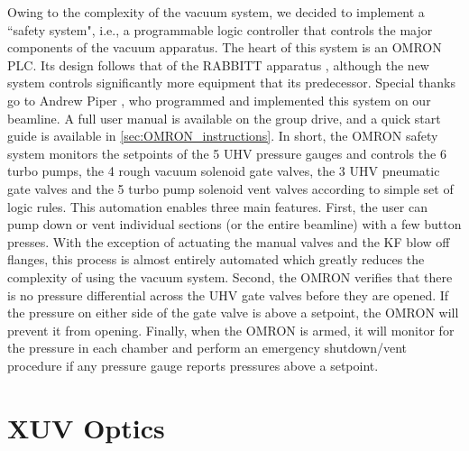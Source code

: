 Owing to the complexity of the vacuum system, we decided to implement a ``safety system", i.e., a programmable logic controller that controls the major components of the vacuum apparatus. The heart of this system is an OMRON PLC. Its design follows that of the RABBITT apparatus \cite{chirlaAttosecondPulseGeneration2011}, although the new system controls significantly more equipment that its predecessor. Special thanks go to Andrew Piper \cite{piperAndrewPiperDissertation}, who programmed and implemented this system on our beamline. A full user manual is available on the group drive, and a quick start guide is available in \cref{sec:OMRON_instructions}. In short, the OMRON safety system monitors the setpoints of the 5 UHV pressure gauges and controls the 6 turbo pumps, the 4 rough vacuum solenoid gate valves, the 3 UHV pneumatic gate valves and the 5 turbo pump solenoid vent valves according to simple set of logic rules. This automation enables three main features. First, the user can pump down or vent individual sections (or the entire beamline) with a few button presses. With the exception of actuating the manual valves and the KF blow off flanges, this process is almost entirely automated which greatly reduces the complexity of using the vacuum system. Second, the OMRON verifies that there is no pressure differential across the UHV gate valves before they are opened. If the pressure on either side of the gate valve is above a setpoint, the OMRON will prevent it from opening. Finally, when the OMRON is armed, it will monitor for the pressure in each chamber and perform an emergency shutdown/vent procedure if any pressure gauge reports pressures above a setpoint.

\section{XUV Optics}
\label{sec:Interferometer_Design}

